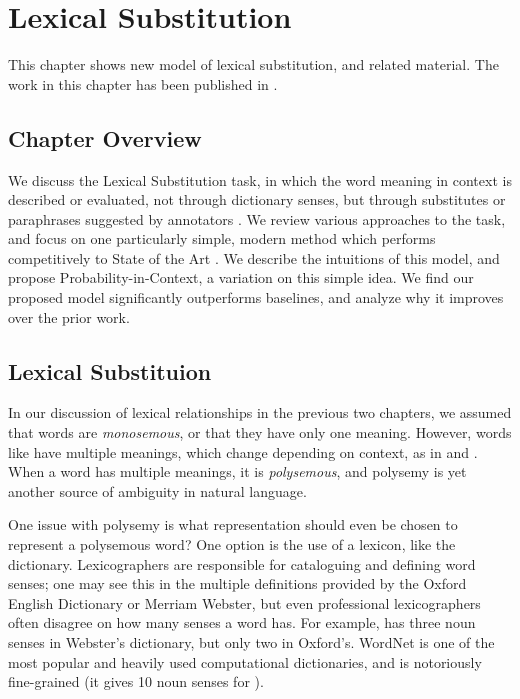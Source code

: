 \chapter{Lexical Substitution}
\label{ch:lexsub}

This chapter shows new model of lexical substitution, and related
material. The work in this chapter has been published in
.

\section{Chapter Overview}

We discuss the Lexical Substitution task, in which the word meaning in context
is described or evaluated, not through dictionary senses, but through
substitutes or paraphrases suggested by annotators
\cite{mccarthy:2007:semeval}. We review various approaches to the task, and
focus on one particularly simple, modern method which performs competitively to
State of the Art \cite{melamud:2015:vsm}. We describe the intuitions of this
model, and propose Probability-in-Context, a variation on this simple idea. We
find our proposed model significantly outperforms baselines, and analyze why it
improves over the prior work.

\section{Lexical Substituion}

In our discussion of lexical relationships in the previous two chapters, we
assumed that words are {\em monosemous}, or that they have only one meaning.
However, words like  have multiple meanings, which change depending
on context, as in  and . When a word has
multiple meanings, it is {\em polysemous}, and polysemy is yet another source
of ambiguity in natural language.

One issue with polysemy is what representation should even be chosen to
represent a polysemous word?  One option is the use of a lexicon, like the
dictionary.  Lexicographers are responsible for cataloguing and defining word
senses; one may see this in the multiple definitions provided by the Oxford
English Dictionary or Merriam Webster, but even professional lexicographers
often disagree on how many senses a word has. For example,  has
three noun senses in Webster's dictionary, but only two in Oxford's.
WordNet \cite{miller:1995:acm} is one of the most popular and heavily used
computational dictionaries, and is notoriously fine-grained (it gives 10
noun senses for ).

